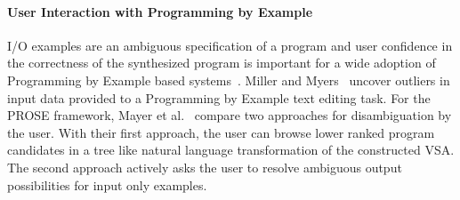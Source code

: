 \documentclass[\myrootdir/main.tex]{subfiles}
\begin{document}
\paragraph{User Interaction with Programming by Example}
I/O examples are an ambiguous specification of a program and user confidence in the correctness of the synthesized program is important for a wide adoption of Programming by Example based systems~\cite{lau2009why-programming-by-demonstration}.
Miller and Myers~\cite{miller2001outlier} uncover outliers in input data provided to a Programming by Example text editing task.
For the PROSE framework, Mayer et al.~\cite{mayer2015user} compare two approaches for disambiguation by the user.
With their first approach, the user can browse lower ranked program candidates in a tree like natural language transformation of the constructed VSA.
The second approach actively asks the user to resolve ambiguous output possibilities for input only examples.
\end{document}

